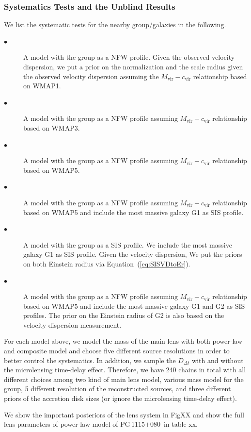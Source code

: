 \documentclass[useAMS,usenatbib]{mnras}
\newcommand\pg{PG\,1115$+$080}
\newcommand{\eref}[1]{Equation~(\ref{#1})}
\newcommand{\Ddt}{{D_{\Delta t}}}
\begin{document}
\subsubsection{Systematics Tests and the Unblind Results}
\label{subsubsec:pg_system}
We list the systematic tests for the nearby group/galaxies in the following. 
\begin{description}
  \item[$\bullet$] A model with the group as a NFW profile. Given the observed velocity dispersion, we put a prior on the normalization and the scale radius given the observed velocity dispersion assuming the $M_{\textrm{vir}}-c_{\textrm{vir}}$ relationship based on WMAP1.
    \item[$\bullet$] A model with the group as a NFW profile assuming $M_{\textrm{vir}}-c_{\textrm{vir}}$ relationship based on WMAP3.
    \item[$\bullet$] A model with the group as a NFW profile assuming $M_{\textrm{vir}}-c_{\textrm{vir}}$ relationship based on WMAP5.
   \item[$\bullet$] A model with the group as a NFW profile assuming $M_{\textrm{vir}}-c_{\textrm{vir}}$ relationship based on WMAP5 and include the most massive galaxy G1 as SIS profile.
    \item[$\bullet$] A model with the group as a SIS profile. We include the most massive galaxy G1 as SIS profile. Given the velocity dispersion, We put the priors on both Einstein radius via \eref{eq:SISVDtoEr}.
   \item[$\bullet$] A model with the group as a NFW profile assuming $M_{\textrm{vir}}-c_{\textrm{vir}}$ relationship based on WMAP5 and include the most massive galaxy G1 and G2 as SIS profiles. The prior on the Einstein radius of G2 is also based on the velocity dispersion measurement.
\end{description}
For each model above, we model the mass of the main lens with both power-law and composite model and choose five different source resolutions in order to better control the systematics. In addition, we sample the $\Ddt$ with and without the microlensing time-delay effect. Therefore, we have 240 chains in total with all different choices among two kind of main lens model, various mass model for the group, 5 different resolution of the reconstructed sources, and three different priors of the accretion disk sizes (or ignore the microlensing time-delay effect). 

We show the important posteriors of the lens system in FigXX and show the full lens parameters of power-law model of \pg~in table xx. 
\end{document}
